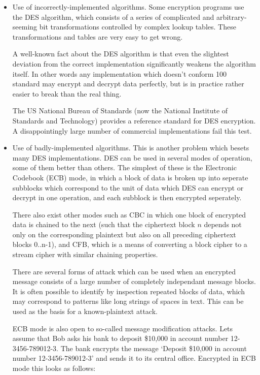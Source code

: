 \begin{itemize}
\item Use of incorrectly-implemented algorithms.  Some encryption programs use the
  DES algorithm, which consists of a series of complicated and arbitrary-
  seeming bit transformations controlled by complex lookup tables.  These
  transformations and tables are very easy to get wrong.

  A well-known fact about the DES algorithm is that even the slightest
  deviation from the correct implementation significantly weakens the algorithm
  itself.  In other words any implementation which doesn't conform 100%
  standard may encrypt and decrypt data perfectly, but is in practice rather
  easier to break than the real thing.

  The US National Bureau of Standards (now the National Institute of Standards
  and Technology) provides a reference standard for DES encryption.  A
  disappointingly large number of commercial implementations fail this test.

\item Use of badly-implemented algorithms.  This is another problem which besets
  many DES implementations.  DES can be used in several modes of operation,
  some of them better than others.  The simplest of these is the Electronic
  Codebook (ECB) mode, in which a block of data is broken up into seperate
  subblocks which correspond to the unit of data which DES can encrypt or
  decrypt in one operation, and each subblock is then encrypted seperately.

  There also exist other modes such as CBC in which one block of encrypted data
  is chained to the next (such that the ciphertext block $n$ depends not only on
  the corresponding plaintext but also on all preceding ciphertext blocks
  \mbox{0..n-1}), and CFB, which is a means of converting a block cipher to a stream
  cipher with similar chaining properties.

  There are several forms of attack which can be used when an encrypted message
  consists of a large number of completely independant message blocks.  It is
  often possible to identify by inspection repeated blocks of data, which may
  correspond to patterns like long strings of spaces in text.  This can be used
  as the basis for a known-plaintext attack.

  ECB mode is also open to so-called message modification attacks.  Lets assume
  that Bob asks his bank to deposit \$10,000 in account number 12-3456-789012-3.
  The bank encrypts the message `Deposit \$10,000 in account number
  12-3456-789012-3' and sends it to its central office.  Encrypted in ECB mode
  this looks as follows:


\end{itemize}
